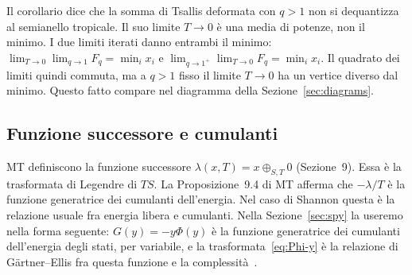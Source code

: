 Il corollario dice che la somma di Tsallis deformata con $q>1$ non si dequantizza al semianello tropicale.
Il suo limite $T\to0$ è una media di potenze, non il minimo.
I due limiti iterati danno entrambi il minimo: $\lim_{T\to0}\lim_{q\to1}F_q=\min_ix_i$ e $\lim_{q\to1^+}\lim_{T\to0}F_q=\min_ix_i$.
Il quadrato dei limiti quindi commuta, ma a $q>1$ fisso il limite $T\to0$ ha un vertice diverso dal minimo.
Questo fatto compare nel diagramma della Sezione~\ref{sec:diagrams}.

\subsection{Funzione successore e cumulanti}

MT definiscono la funzione successore $\lambda(x,T)=x\oplus_{S,T}0$ (Sezione~9).
Essa è la trasformata di Legendre di $TS$.
La Proposizione~9.4 di MT afferma che $-\lambda/T$ è la funzione generatrice dei cumulanti dell'energia.
Nel caso di Shannon questa è la relazione usuale fra energia libera e cumulanti.
Nella Sezione~\ref{sec:spy} la useremo nella forma seguente: $G(y)=-y\Phi(y)$ è la funzione generatrice dei cumulanti dell'energia degli stati, per variabile, e la trasformata~\eqref{eq:Phi-y} è la relazione di Gärtner--Ellis fra questa funzione e la complessità~\citep{touchette2009large}.
